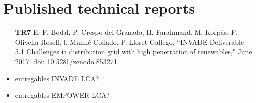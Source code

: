 \section*{Published technical reports}

\begin{itemize}
	\item[\textbf{TR7}] E. F. B\o{}dal, P. Crespo-del-Granado, H. Farahmand, M. Korp\aa{}s, P. Olivella-Rosell, I. Munn\'{e}-Collado, P. Lloret-Gallego, ``INVADE Deliverable 5.1 Challenges in distribution grid with high penetration of renewables," June 2017. doi: 10.5281/zenodo.853271
	\item entregables INVADE LCA? 
	\item entregables EMPOWER LCA? 
	

\end{itemize}
